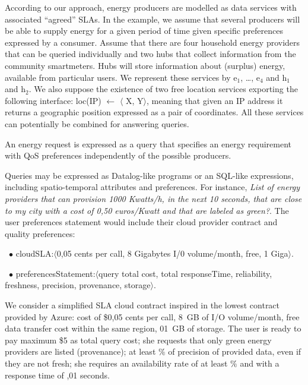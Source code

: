 According to our approach, energy producers are modelled as data services with associated ``agreed'' SLAs. In the example, we assume that several producers will be able to supply energy for a given period of time given specific  preferences expressed by a consumer. 
Assume that there are four household energy providers that can be queried individually and two hubs that collect information from the community smartmeters.
Hubs will store information about (surplus) energy, available from particular users.
We represent these services by {\sf e$_1$, \dots, e$_4$} and {\sf h$_1$ and h$_2$}.
We also suppose the existence of two free location services exporting the following interface: {\sf loc(IP) $\leftarrow$ $\langle$ X, Y$\rangle$}, meaning that given an IP address it returns a geographic position expressed as a pair of coordinates. 
All these services can potentially be combined for answering queries.



An energy request is expressed as a query that specifies an energy requirement with QoS preferences independently of the possible producers. 

Queries may be expressed as Datalog-like programs or an SQL-like expressions, including spatio-temporal attributes and preferences.
For instance, \textit{List of energy providers that can provision 1000 Kwatts/h, in the next 10 seconds, that are close to my city with a cost of 0,50 euros/Kwatt and that are labeled as green?}. 
The user preferences statement would include their cloud provider contract and quality preferences:

\begin{trivlist}\sf\footnotesize
\item[~$\bullet$ ]  {\sf cloudSLA:$\langle$0,05 cents per call, 8 Gigabytes I/0 volume/month, free, 1 Giga$\rangle$}. 
\item[~$\bullet$ ] {\sf preferencesStatement:$\langle$query total cost,  total responseTime, reliability, freshness, precision, provenance, storage$\rangle$}. 
\end{trivlist}


We consider a simplified SLA cloud contract inspired in the lowest contract provided by Azure: {\sf cost of \$0,05 cents per call,  8~GB of I/O volume/month, free data transfer cost within the same region,  01~GB of storage}. 
The user is ready to pay maximum {\sf \$5 as total query cost}; she requests that only {\sf green} energy providers are listed (provenance); at least {$\%$} of precision of provided data, even if they are not fresh; she requires an availability rate of at least {$\%$} and with a response time of {,01 seconds}.
 
